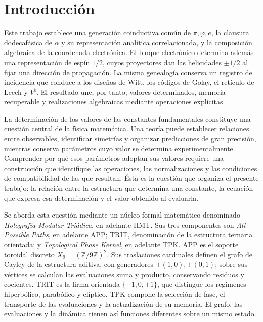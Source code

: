 \section{Introducción}
\label{sec:introduccion}

Este trabajo establece una generación coinductiva común de
\(\pi,\varphi,e\), la clausura dodecafásica de \(\alpha\) y su
representación analítica correlacionada, y la composición algebraica de
la coordenada electrónica. El bloque electrónico determina además una
representación de espín \(1/2\), cuyos proyectores dan las helicidades
\(\pm1/2\) al fijar una dirección de propagación. La misma genealogía
conserva un registro de incidencia que conduce a los diseños de Witt,
los códigos de Golay, el retículo de Leech y \(V^\natural\). El
resultado une, por tanto, valores determinados, memoria recuperable y
realizaciones algebraicas mediante operaciones explícitas.

La determinación de los valores de las constantes fundamentales constituye una
cuestión central de la física matemática. Una teoría puede establecer relaciones
entre observables, identificar simetrías y organizar predicciones de gran precisión,
mientras conserva parámetros cuyo valor se determina experimentalmente.
Comprender por qué esos parámetros adoptan sus valores requiere una construcción
que identifique las operaciones, las normalizaciones y las condiciones de
compatibilidad de las que resultan. Ésta es la cuestión que organiza el presente
trabajo: la relación entre la estructura que determina una constante, la ecuación
que expresa esa determinación y el valor obtenido al evaluarla.

Se aborda esta cuestión mediante un núcleo formal matemático denominado
\emph{Holografía Modular Triádica}, en adelante HMT. Sus tres componentes son
\emph{All Possible Paths}, en adelante APP; TRIT, denominación de la estructura
ternaria orientada; y \emph{Topological Phase Kernel}, en adelante TPK.
APP es el soporte toroidal discreto \(X_9=(\mathbb Z/9\mathbb Z)^2\).
Sus traslaciones cardinales definen el grafo de Cayley de la estructura
aditiva, con generadores \(\pm(1,0),\pm(0,1)\); sobre sus vértices
se calculan las evaluaciones suma y producto, conservando residuos y
cocientes. TRIT es la firma orientada \(\{-1,0,+1\}\), que distingue
los regímenes hiperbólico, parabólico y elíptico. TPK compone la selección
de fase, el transporte de las evaluaciones y la actualización de su
memoria. El grafo, las evaluaciones y la dinámica tienen así funciones
diferentes sobre un mismo estado.

